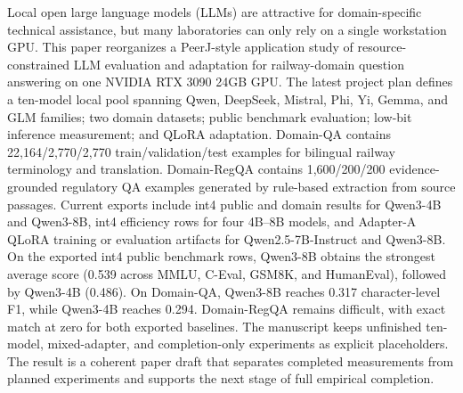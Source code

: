 Local open large language models (LLMs) are attractive for domain-specific
technical assistance, but many laboratories can only rely on a single
workstation GPU. This paper reorganizes a PeerJ-style application study of
resource-constrained LLM evaluation and adaptation for railway-domain question
answering on one NVIDIA RTX 3090 24GB GPU. The latest project plan defines a
ten-model local pool spanning Qwen, DeepSeek, Mistral, Phi, Yi, Gemma, and GLM
families; two domain datasets; public benchmark evaluation; low-bit inference
measurement; and QLoRA adaptation. Domain-QA contains 22,164/2,770/2,770
train/validation/test examples for bilingual railway terminology and
translation. Domain-RegQA contains 1,600/200/200 evidence-grounded regulatory
QA examples generated by rule-based extraction from source passages. Current
exports include int4 public and domain results for Qwen3-4B and Qwen3-8B,
int4 efficiency rows for four 4B--8B models, and Adapter-A QLoRA training or
evaluation artifacts for Qwen2.5-7B-Instruct and Qwen3-8B. On the exported
int4 public benchmark rows, Qwen3-8B obtains the strongest average score
(0.539 across MMLU, C-Eval, GSM8K, and HumanEval), followed by Qwen3-4B
(0.486). On Domain-QA, Qwen3-8B reaches 0.317 character-level F1, while
Qwen3-4B reaches 0.294. Domain-RegQA remains difficult, with exact match at
zero for both exported baselines. The manuscript keeps unfinished ten-model,
mixed-adapter, and completion-only experiments as explicit placeholders. The
result is a coherent paper draft that separates completed measurements from
planned experiments and supports the next stage of full empirical completion.
